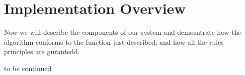 \documentclass[a4paper, 11pt]{article}
\begin{document}

\section{Implementation Overview}

Now we will describe the components of our system and demosntrate how the algorithm conforms to the function just described, and how all the rules principles are gurantedd. 









to be continued

\end{document}
